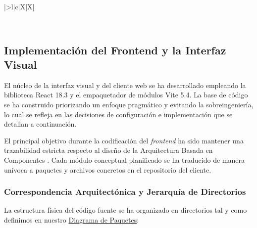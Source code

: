 {\begin{xltabular}{\textwidth}{|>{\bfseries}l|c|X|X|}
        \caption{Especificación técnica de los endpoints expuestos en la implementación de la API REST.} \label{tab:api_endpoints} \\
    \end{xltabular}
}


\subsection{Implementación del Frontend y la Interfaz Visual}
\label{sec:implementacion_frontend}

El núcleo de la interfaz visual y del cliente web se ha desarrollado empleando la biblioteca React 18.3 \cite{bib:react} y el empaquetador de módulos Vite 5.4. La base de código se ha construido priorizando un enfoque pragmático y evitando la sobreingeniería, lo cual se refleja en las decisiones de configuración e implementación que se detallan a continuación.

El principal objetivo durante la codificación del \textit{frontend} ha sido mantener una trazabilidad estricta respecto al diseño de la Arquitectura Basada en Componentes \cite{bib:clean_architecture}. Cada módulo conceptual planificado se ha traducido de manera unívoca a paquetes y archivos concretos en el repositorio del cliente.

\subsubsection{Correspondencia Arquitectónica y Jerarquía de Directorios}

La estructura física del código fuente se ha organizado en directorios tal y como definimos en nuestro \hyperref[fig:diagrama_paquetes]{Diagrama de Paquetes}:

